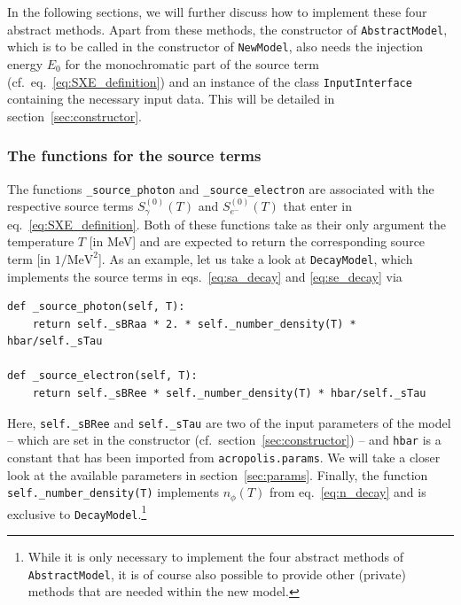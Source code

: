 \documentclass[11pt,a4paper]{article}
\begin{document}
\vspace{4mm}
In the following sections, we will further discuss how to implement these four abstract methods. Apart from these methods, the constructor of \texttt{AbstractModel}, which is to be called in the constructor of \texttt{NewModel}, also needs the injection energy $E_0$ for the monochromatic part of the source term (cf.\ eq.~\eqref{eq:SXE_definition}) and an instance of the class \texttt{InputInterface} containing the necessary input data. This will be detailed in section~\ref{sec:constructor}.

\subsubsection{The functions for the source terms}
The functions \texttt{\_source\_photon} and \texttt{\_source\_electron} are associated with the respective source terms $S_\gamma^{(0)}(T)$ and $S_{e^-}^{(0)}(T)$ that enter in eq.~\eqref{eq:SXE_definition}. Both of these functions take as their only argument the temperature $T$ [in MeV] and are expected to return the corresponding source term [in $1/\mathrm{MeV}^2$]. As an example, let us take a look at \texttt{DecayModel}, which implements the source terms in eqs.~\eqref{eq:sa_decay} and \eqref{eq:se_decay} via
\begin{lstlisting}
def _source_photon(self, T):
	return self._sBRaa * 2. * self._number_density(T) * hbar/self._sTau

def _source_electron(self, T):
	return self._sBRee * self._number_density(T) * hbar/self._sTau
\end{lstlisting}
Here, \texttt{self.\_sBRee} and \texttt{self.\_sTau} are two of the input parameters of the model -- which are set in the constructor (cf.\ section~\ref{sec:constructor}) -- and \texttt{hbar} is a constant that has been imported from \texttt{acropolis.params}. We will take a closer look at the available parameters in section~\ref{sec:params}. Finally, the function \texttt{self.\_number\_density(T)} implements $n_\phi(T)$ from eq.~\eqref{eq:n_decay} and is exclusive to \texttt{DecayModel}.\footnote{While it is only necessary to implement the four abstract methods of \texttt{AbstractModel}, it is of course also possible to provide other (private) methods that are needed within the new model.}
\end{document}
